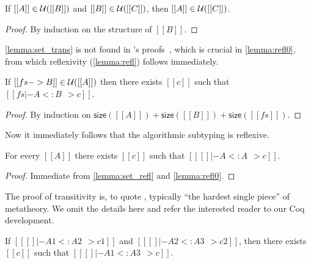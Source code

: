 \begin{lemma} \label{lemma:set_trans}
  If $[[A]] \in \mathcal{U}([[B]])$ and $[[B]] \in \mathcal{U}([[C]])$, then $[[A]] \in \mathcal{U}([[C]])$.
\end{lemma}
\begin{proof}
  By induction on the structure of $[[B]]$.
\end{proof}

\begin{remark}
  \cref{lemma:set_trans} is not found in \citeauthor{pierce1989decision}'s proofs~\citep{pierce1989decision}, which is
  crucial in \cref{lemma:refl0}, from which reflexivity (\cref{lemma:refl})
  follows immediately.
\end{remark}


\begin{lemma} \label{lemma:refl0}
  If $[[fs -> B]] \in \mathcal{U}([[A]])$ then there exists $[[c]]$ such that $[[fs |- A <: B ~~> c]]$.
\end{lemma}
\begin{proof}
  By induction on $\mathsf{size}([[A]]) + \mathsf{size}([[B]]) + \mathsf{size}([[fs]])$.
\end{proof}

Now it immediately follows that the algorithmic subtyping is reflexive.

\begin{lemma}[Reflexivity] \label{lemma:refl}
  For every $[[A]]$ there exists $[[c]]$ such that $[[ [] |- A <: A ~~> c]]$.
\end{lemma}
\begin{proof}
  Immediate from \cref{lemma:set_refl} and \cref{lemma:refl0}.
\end{proof}

The proof of transitivity is, to quote \citet{pierce1989decision}, typically
``the hardest single piece'' of metatheory. We omit the details here and
refer the interested reader to our Coq development.

\begin{lemma}[Transitivity] \label{lemma:trans}
  If $[[ [] |- A1 <: A2 ~~> c1]]$ and $[[ [] |- A2 <: A3 ~~> c2]]$, then there
  exists $[[c]]$ such that $[[ [] |- A1 <: A3 ~~> c]]$.
\end{lemma}

